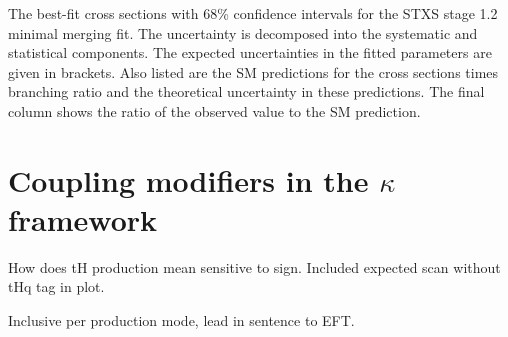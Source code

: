 \begin{table}[htbp]
  \centering
  \scriptsize
  \renewcommand{\arraystretch}{1.8}
  \setlength{\tabcolsep}{2.2pt}
  \caption{
    The best-fit cross sections with 68\% confidence intervals for the STXS stage 1.2 minimal merging fit. The uncertainty is decomposed into the systematic and statistical components. The expected uncertainties in the fitted parameters are given in brackets. Also listed are the SM predictions for the cross sections times branching ratio and the theoretical uncertainty in these predictions. The final column shows the ratio of the observed value to the SM prediction.
  }
  \label{tab:stage1p2_minimal_results}
  
\end{table}

\newpage
\section{Coupling modifiers in the $\kappa$ framework}\label{sec:results_kappa}
How does tH production mean sensitive to sign.
Included expected scan without tHq tag in plot. 

Inclusive per production mode, lead in sentence to EFT.